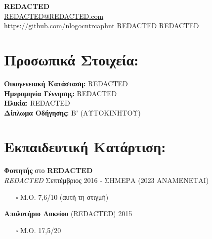 \documentclass[letterpaper, 11pt]{article}
\newcommand{\iconSpace}{\hspace{1px}}
\newcommand{\hSpace}{\hspace{8px}}
\newcommand{\secStartSpace}{\vspace{3pt}}
\newcommand{\secEndSpace}{\vspace{5pt}}
\newcommand{\spaceCollapse}{\vspace{-5pt}}
\begin{document}
\begin{center} 
	{\Large \textbf{REDACTED}}\\
	\vspace{1px}
	{\footnotesize
		 \href{mailto:REDACTED}{REDACTED@REDACTED.com} 
		}\\
	{\footnotesize
		 \iconSpace \href{https://github.com/nlogocntrcaphnt}{https://github.com/nlogocntrcaphnt}
		\hSpace 
		 \iconSpace
		REDACTED
		\hSpace 
		 \iconSpace
		\href{}{REDACTED}
	}
\end{center}
\spaceCollapse

\section{\color{red} \textbf{Προσωπικά Στοιχεία:}}
\secStartSpace

\begin{addmargin}[1em]{1em}
	\textbf{Οικογενειακή Κατάσταση:} REDACTED\\
	\textbf{Ημερομηνία Γέννησης:} REDACTED\\
	\textbf{Ηλικία:} REDACTED\\
	\textbf{Δίπλωμα Οδήγησης:} Β' (ΑΥΤΟΚΙΝΗΤΟΥ)\\
\end{addmargin}
\secEndSpace

\spaceCollapse

\section{\color{red} \textbf{Εκπαιδευτική Κατάρτιση:}}
\secStartSpace

\begin{addmargin}[1em]{1em}
	\textbf{Φοιτητής} στο \textbf{REDACTED}\\
	\setlength\parindent{1cm} \textit{REDACTED} \hfill Σεπτέμβριος 2016 - ΣΗΜΕΡΑ (2023 ΑΝΑΜΕΝΕΤΑΙ)
	\begin{itemize}
		\item[$\square$] \small{Μ.Ο. 7,6/10} \footnotesize{(αυτή τη στιγμή)}
	\end{itemize}
\end{addmargin}

\begin{addmargin}[1em]{1em}
	\textbf{Απολυτήριο Λυκείου} (REDACTED) \hfill 2015
	\begin{itemize}
		\item[$\square$]  \small{Μ.Ο. 17,5/20}
	\end{itemize}
\end{addmargin}
\end{document}

